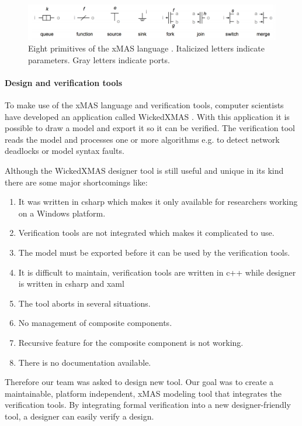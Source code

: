 \begin{figure}[here]
\includegraphics[width=1.0\textwidth]{xmas-language}
\caption{Eight primitives of the xMAS language \cite{6225465}. Italicized letters indicate
parameters. Gray letters indicate ports.}
\label{fig:xmas-language}
\end{figure}

\paragraph{Design and verification tools}

To make use of the xMAS language and verification tools, computer scientists
have developed an application called WickedXMAS \cite{WickedXmas}.
With this application it is possible to draw a model and export it so it can be
verified. The verification tool reads the model and processes one or more
algorithms e.g. to detect network deadlocks or model syntax faults.

Although the WickedXMAS designer tool is still useful and unique in its kind
there are some major shortcomings like:
\begin{enumerate}
\item It was written in csharp which makes it only available for researchers
working on a Windows platform.
\item Verification tools are not integrated which
makes it complicated to use.
\item The model must be exported before it can be
used by the verification tools.
\item It is difficult to maintain, verification tools are written in c++ while
designer is written in csharp and xaml
\item The tool aborts in several situations.
\item No management of composite components.
\item Recursive feature for the composite component is not working.
\item There is no documentation available.
\end{enumerate}

Therefore our team was asked to design new tool. Our goal was to
create a maintainable, platform independent, xMAS modeling tool that integrates
the verification tools.
By integrating formal verification into a new designer-friendly tool, a designer
can easily verify a design.

